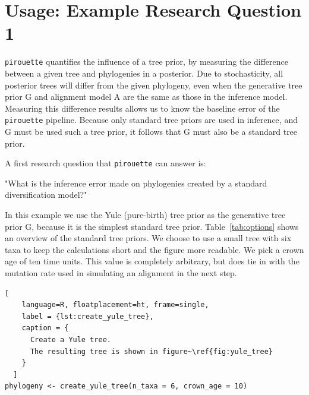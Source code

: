 \documentclass{article}
\begin{document}
\section{Usage: Example Research Question 1}

\verb;pirouette; quantifies the influence of a tree prior,
by measuring the difference between a given tree and 
phylogenies in a posterior. Due to stochasticity, all posterior trees
will differ from the given phylogeny, even when the generative tree
prior G and alignment model A are the same as 
those in the inference model.
Measuring this difference results allows us to know the baseline error
of the \verb;pirouette; pipeline.
Because only standard tree priors are used in inference, 
and G must be used such a tree prior, it follows that
G must also be a standard tree prior.

A first research question that \verb;pirouette; can answer is:

"What is the inference error made on phylogenies
created by a standard diversification model?"

In this example we use the Yule (pure-birth) tree prior 
as the generative tree prior G,
because it is the simplest standard tree prior. 
Table~\ref{tab:options} shows an overview of the standard
tree priors.
We choose to use a small tree with six taxa to keep
the calculations short and the figure more readable.
We pick a crown age of ten time units. This value is 
completely arbitrary, but does tie in with the mutation rate 
used in simulating an alignment in the next step.

\begin{lstlisting}[
    language=R, floatplacement=ht, frame=single, 
    label = {lst:create_yule_tree}, 
    caption = {
      Create a Yule tree. 
      The resulting tree is shown in figure~\ref{fig:yule_tree}
    }
  ]
phylogeny <- create_yule_tree(n_taxa = 6, crown_age = 10)
\end{lstlisting}
\end{document}
